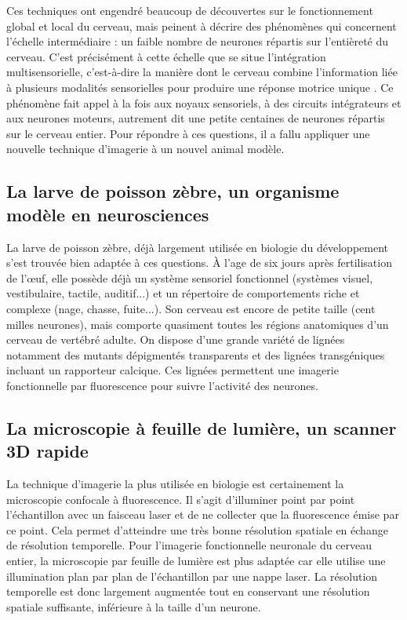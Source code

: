 Ces techniques ont engendré beaucoup de découvertes sur le fonctionnement global et local du cerveau, mais peinent à décrire des phénomènes qui concernent l'échelle intermédiaire : un faible nombre de neurones répartis sur l'entièreté du cerveau. C'est précisément à cette échelle que se situe l'intégration multisensorielle, c'est-à-dire la manière dont le cerveau combine l'information liée à plusieurs modalités sensorielles pour produire une réponse motrice unique \cite{stein_multisensory_2008}. Ce phénomène fait appel à la fois aux noyaux sensoriels, à des circuits intégrateurs et aux neurones moteurs, autrement dit une petite centaines de neurones répartis sur le cerveau entier. Pour répondre à ces questions, il a fallu appliquer une nouvelle technique d'imagerie à un nouvel animal modèle.


\subsection{La larve de poisson zèbre, un organisme modèle en neurosciences}

La larve de poisson zèbre, déjà largement utilisée en biologie du développement s'est trouvée bien adaptée à ces questions. À l'age de six jours après fertilisation de l’œuf, elle possède déjà un système sensoriel fonctionnel (systèmes visuel, vestibulaire, tactile, auditif...) et un répertoire de comportements riche et complexe (nage, chasse, fuite...). Son cerveau est encore de petite taille (cent milles neurones), mais comporte quasiment toutes les régions anatomiques d'un cerveau de vertébré adulte. On dispose d'une grande variété de lignées notamment des mutants dépigmentés transparents et des lignées transgéniques incluant un rapporteur calcique. Ces lignées permettent une imagerie fonctionnelle par fluorescence pour suivre l'activité des neurones.

\subsection{La microscopie à feuille de lumière, un scanner 3D rapide}

La technique d'imagerie la plus utilisée en biologie est certainement la microscopie confocale à fluorescence. Il s'agit d'illuminer point par point l'échantillon avec un faisceau laser et de ne collecter que la fluorescence émise par ce point. Cela permet d'atteindre une très bonne résolution spatiale en échange de résolution temporelle. Pour l'imagerie fonctionnelle neuronale du cerveau entier, la microscopie par feuille de lumière est plus adaptée car elle utilise une illumination plan par plan de l'échantillon par une nappe laser. La résolution temporelle est donc largement augmentée tout en conservant une résolution spatiale suffisante, inférieure à la taille d'un neurone. 

